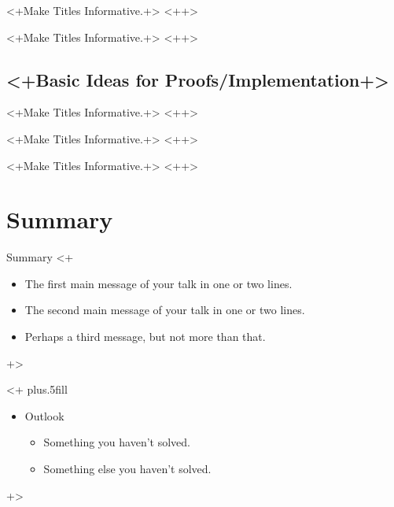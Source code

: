 \documentclass{beamer}
\begin{document}
\begin{frame}{<+Make Titles Informative.+>}
    <++>
\end{frame}

\begin{frame}{<+Make Titles Informative.+>}
    <++>
\end{frame}


\subsection{<+Basic Ideas for Proofs/Implementation+>}

\begin{frame}{<+Make Titles Informative.+>}
    <++>
\end{frame}

\begin{frame}{<+Make Titles Informative.+>}
    <++>
\end{frame}

\begin{frame}{<+Make Titles Informative.+>}
    <++>
\end{frame}



\section*{Summary}

\begin{frame}{Summary}
    <+

  \begin{itemize}
  \item
    The \alert{first main message} of your talk in one or two lines.
  \item
    The \alert{second main message} of your talk in one or two lines.
  \item
    Perhaps a \alert{third message}, but not more than that.
  \end{itemize}+>
  
  <+%
  \vskip0pt plus.5fill
  \begin{itemize}
  \item
    Outlook
    \begin{itemize}
    \item
      Something you haven't solved.
    \item
      Something else you haven't solved.
    \end{itemize}
  \end{itemize}+>
\end{frame}
\end{document}
